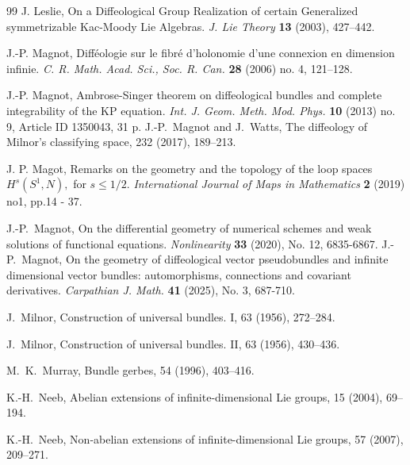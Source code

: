 \documentclass[11pt]{amsart}
\begin{document}
\begin{thebibliography}{99}
    	 J. Leslie,  On a Diffeological Group Realization of
	certain Generalized symmetrizable Kac-Moody Lie Algebras. \textit{J.
		Lie Theory} \textbf{13} (2003), 427--442.
    
     J.-P. Magnot,  Diff\'eologie sur le fibr\'e d'holonomie d'une connexion en dimension infinie.
	\textit{C. R. Math. Acad. Sci., Soc. R. Can.} \textbf{28} (2006) no. 4, 121--128.

    	 J.-P. Magnot,  Ambrose-Singer theorem on diffeological bundles and complete integrability of the KP equation. \textit{Int. J. Geom. Meth. Mod. Phys.} \textbf{ 10} (2013) no. 9, Article ID 1350043, 31 p.  
J.-P.~Magnot and J.~Watts,
\newblock The diffeology of Milnor's classifying space,
 232 (2017), 189--213.

 J. P. Magot,
\newblock Remarks on the geometry and the topology of the loop spaces $H^s(S^1,N),$
for $s \leq 1/2.$
\newblock \emph{International Journal of Maps in Mathematics} {\bf 2} (2019) no1, pp.14 - 37.

 J.-P.~Magnot,
\newblock  On the differential geometry of numerical schemes and weak solutions of functional equations. 
\newblock \emph{Nonlinearity} {\bf 33} (2020), No. 12, 6835-6867. 
J.-P.~Magnot,
\newblock  On the geometry of diffeological vector pseudobundles and infinite dimensional vector bundles: automorphisms, connections and covariant derivatives. 
\newblock \emph{Carpathian J. Math.} {\bf 41} (2025), No. 3, 687-710. 



J.~Milnor,
\newblock Construction of universal bundles. I,
 63 (1956), 272--284.

J.~Milnor,
\newblock Construction of universal bundles. II,
 63 (1956), 430--436.

M.~K.~Murray,
\newblock Bundle gerbes,
 54 (1996), 403--416.

K.-H.~Neeb,
\newblock Abelian extensions of infinite-dimensional Lie groups,
 15 (2004), 69--194.

K.-H.~Neeb,
\newblock Non-abelian extensions of infinite-dimensional Lie groups,
 57 (2007), 209--271.


\end{thebibliography}
\end{document}
